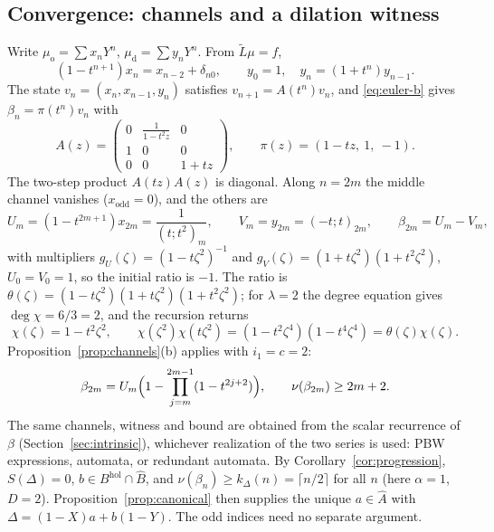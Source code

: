 \documentclass[11pt,a4paper]{article}
\newcommand{\Bhat}{\widehat B}
\newcommand{\Ahat}{\widehat A}
\newcommand{\Bhol}{B^{\mathrm{hol}}}
\newcommand{\val}{\nu}
\newcommand{\Lt}{\widetilde L}
\theoremstyle{plain}
\theoremstyle{definition}
\theoremstyle{remark}
\begin{document}
\subsection{Convergence: channels and a dilation witness}
Write $\mu_{\mathrm o}=\sum x_nY^n$, $\mu_{\mathrm d}=\sum y_nY^n$. From $\Lt\mu=f$,
\[
  (1-t^{n+1})x_n=x_{n-2}+\delta_{n0},\qquad y_0=1,\quad y_n=(1+t^n)y_{n-1}.
\]
The state $v_n=(x_n,x_{n-1},y_n)$ satisfies $v_{n+1}=A(t^n)v_n$, and
\eqref{eq:euler-b} gives $\beta_n=\pi(t^n)v_n$ with
\[
  A(z)=\begin{pmatrix}0&\frac1{1-t^2z}&0\\1&0&0\\0&0&1+tz\end{pmatrix},\qquad
  \pi(z)=(1-tz,\ 1,\ -1).
\]
The two-step product $A(tz)A(z)$ is diagonal. Along $n=2m$ the middle channel
vanishes ($x_{\mathrm{odd}}=0$), and the others are
\[
  U_m=(1-t^{2m+1})x_{2m}=\frac1{(t;t^2)_m},\qquad V_m=y_{2m}=(-t;t)_{2m},\qquad
  \beta_{2m}=U_m-V_m,
\]
with multipliers $g_U(\zeta)=(1-t\zeta^2)^{-1}$ and
$g_V(\zeta)=(1+t\zeta^2)(1+t^2\zeta^2)$, $U_0=V_0=1$, so the initial ratio is
$-1$. The ratio is
$\theta(\zeta)=(1-t\zeta^2)(1+t\zeta^2)(1+t^2\zeta^2)$; for $\lambda=2$ the
degree equation gives $\deg\chi=6/3=2$, and the recursion returns
\begin{equation}\label{eq:euler-witness}
  \chi(\zeta)=1-t^2\zeta^2,\qquad \chi(\zeta^2)\chi(t\zeta^2)=(1-t^2\zeta^4)(1-t^4\zeta^4)=\theta(\zeta)\chi(\zeta).
\end{equation}
Proposition~\ref{prop:channels}(b) applies with $i_1=c=2$:
\[
  \beta_{2m}=U_m\Bigl(1-\prod_{j=m}^{2m-1}(1-t^{2j+2})\Bigr),\qquad \val(\beta_{2m})\ge2m+2.
\]
The same channels, witness and bound are obtained from the scalar recurrence
of $\beta$ (Section~\ref{sec:intrinsic}), whichever realization of the two
series is used: PBW expressions, automata, or redundant automata.
By Corollary~\ref{cor:progression}, $S(\Delta)=0$, $b\in\Bhol\cap\Bhat$, and
$\val(\beta_n)\ge k_\Delta(n)=\lceil n/2\rceil$ for all $n$ (here $\alpha=1$, $D=2$).
Proposition~\ref{prop:canonical} then supplies the unique $a\in\Ahat$ with
$\Delta=(1-X)a+b(1-Y)$. The odd indices need no separate argument.
\end{document}
